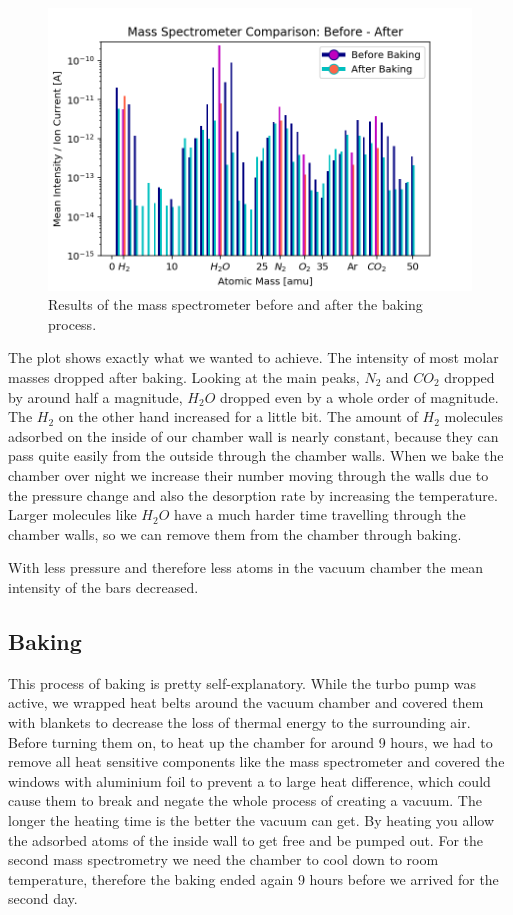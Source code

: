 \documentclass[]{article}
\begin{document}
\begin{figure}[h]
\centering\includegraphics[width=.8\textwidth]{Plots/BeforeAfter.png}
\caption{Results of the mass spectrometer before and after the baking process.}
\label{fig::BeforeAfter}
\end{figure}

The plot shows exactly what we wanted to achieve. The intensity of most molar masses dropped after baking. Looking at the main peaks, $N_2$ and $CO_2$ dropped by around half a magnitude,  $H_2O$ dropped even by a whole order of magnitude. The $H_2$ on the other hand increased for a little bit. The amount of $H_2$ molecules adsorbed on the inside of our chamber wall is nearly constant, because they can pass quite easily from the outside through the chamber walls. When we bake the chamber over night we increase their number moving through the walls due to the pressure change and also the desorption rate by increasing the temperature. Larger molecules like $H_{2}O$ have a much harder time travelling through the chamber walls, so we can remove them from the chamber through baking. 

With less pressure and therefore less atoms in the vacuum chamber the mean intensity of the bars decreased. 

\subsection{Baking}
This process of baking is pretty self-explanatory. While the turbo pump was active, we wrapped heat belts around the vacuum chamber and covered them with blankets to decrease the loss of thermal energy to the surrounding air. Before turning them on, to heat up the chamber for around 9 hours, we had to remove all heat sensitive components like the mass spectrometer and covered the windows with aluminium foil to prevent a to large heat difference, which could cause them to break and negate the whole process of creating a vacuum.
The longer the heating time is the better the vacuum can get. By heating you allow the adsorbed atoms of the inside wall to get free and be pumped out. 
For the second mass spectrometry we need the chamber to cool down to room temperature, therefore the baking ended again 9 hours before we arrived for the second day.
\end{document}
